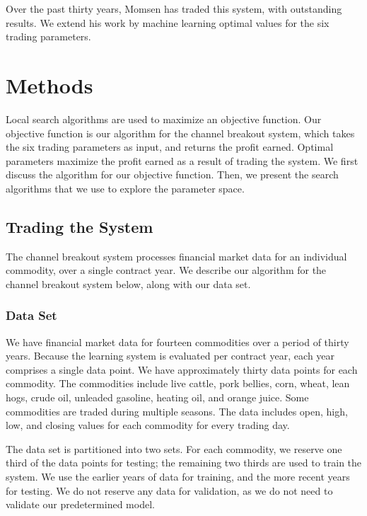 \documentclass[12pt]{article}
\begin{document}
Over the past thirty years, Momsen has traded this system, with outstanding
results.  We extend his work by machine learning optimal values for the six
trading parameters.

\section{Methods}

Local search algorithms are used to maximize an objective function. Our
objective function is our algorithm for the channel breakout system, which
takes the six trading parameters as input, and returns the profit
earned. Optimal parameters maximize the profit earned as a result of trading the
system. We first discuss the algorithm for our objective function. Then, we
present the search algorithms that we use to explore the parameter space.

\subsection{Trading the System}

The channel breakout system processes financial market data for an individual
commodity, over a single contract year.  We describe our algorithm for the
channel breakout system below, along with our data set.

\vspace{25pt}
\subsubsection{Data Set}

We have financial market data for fourteen commodities over a period of thirty
years.  Because the learning system is evaluated per contract year, each year
comprises a single data point.  We have approximately thirty data points for
each commodity.  The commodities include live cattle, pork bellies, corn,
wheat, lean hogs, crude oil, unleaded gasoline, heating oil, and orange juice.
Some commodities are traded during multiple seasons.  The data includes open,
high, low, and closing values for each commodity for every trading day.

The data set is partitioned into two sets. For each commodity, we reserve one
third of the data points for testing; the remaining two thirds are used to train
the system. We use the earlier years of data for training, and the more recent
years for testing. We do not reserve any data for validation, as we do not need
to validate our predetermined model.
\end{document}
